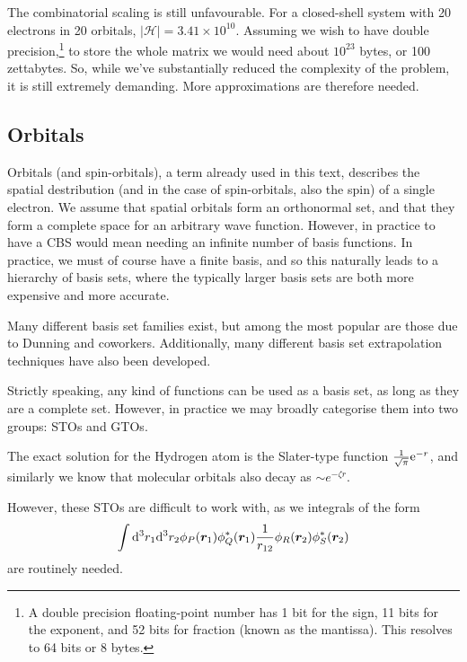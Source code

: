 The combinatorial scaling is still unfavourable. For a closed-shell system with 20 electrons in 20 orbitals, $|\mathcal{H}|=3.41\times 10^{10}$. Assuming we wish to have double precision,\footnote{A double precision floating-point number has 1 bit for the sign, 11 bits for the exponent, and 52 bits for fraction (known as the mantissa).\cite{ascherFirst2011} This resolves to 64 bits or 8 bytes.} to store the whole matrix we would need about $10^{23}$ bytes, or 100 zettabytes. So, while we've substantially reduced the complexity of the problem, it is still extremely demanding. More approximations are therefore needed.

\subsection{Orbitals}
\label{sec:orbitals}

Orbitals (and spin-orbitals), a term already used in this text, describes the spatial destribution (and in the case of spin-orbitals, also the spin) of a single electron. We assume that spatial orbitals form an orthonormal set, and that they form a complete space for an arbitrary wave function. However, in practice to have a \gls{CBS} would mean needing an infinite number of basis functions. In practice, we must of course have a finite basis, and so this naturally leads to a hierarchy of basis sets, where the typically larger basis sets are both more expensive and more accurate.

Many different basis set families exist, but among the most popular are those due to Dunning and coworkers. Additionally, many different basis set extrapolation techniques have also been developed.

Strictly speaking, any kind of functions can be used as a basis set, as long as they are a complete set. However, in practice we may broadly categorise them into two groups: \glspl{STO} and \glspl{GTO}.

The exact solution for the Hydrogen atom is the Slater-type function $\frac 1{\sqrt{\pi}} \mathrm{e}^{-r}$, and similarly we know that molecular orbitals also decay as $\sim e^{-\zeta r}$.

However, these \glspl{STO} are difficult to work with, as we integrals of the form
\begin{equation}
    \label{eq:two-body-integral}
\int\mathrm{d}^3r_1\mathrm{d}^3r_2 \phi_P(\bm r_1)\phi_Q^*(\bm r_1)\frac 1 {r_{12}}\phi_R(\bm r_2)\phi_S^*(\bm r_2)
\end{equation}
are routinely needed.

